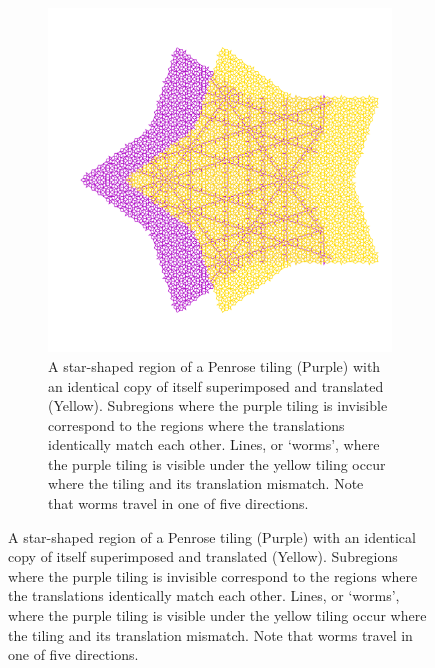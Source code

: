 \documentclass[
  oneside,
  11pt, a4paper,
  footinclude=true,
  headinclude=true,
  cleardoublepage=empty
]{scrbook}
\begin{document}
\begin{figure}[H]
\centering
\begin{subfigure}{0.8\textwidth}
\includegraphics[width=\textwidth]{reTranslateFar}
\caption{A star-shaped region of a Penrose tiling (Purple) with an identical copy of itself superimposed and translated (Yellow). Subregions where the purple tiling is invisible correspond to the regions where the translations identically match each other. Lines, or `worms', where the purple tiling is visible under the yellow tiling occur where the tiling and its translation mismatch. Note that worms travel in one of five directions.}
\label{fig:far}
\end{subfigure}


\end{figure}
\end{document}
